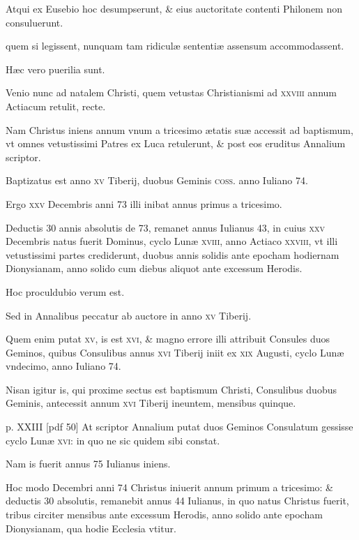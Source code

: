 \begin{parnumbers}
Atqui ex Eusebio
hoc desumpserunt, \& eius auctoritate contenti Philonem non consuluerunt.

quem si legissent, nunquam tam ridiculæ sententiæ assensum
accommodassent.

Hæc vero puerilia sunt.

Venio nunc ad natalem
Christi, quem vetustas Christianismi ad \textsc{xxviii} annum Actiacum
retulit, recte.

Nam Christus iniens annum vnum a tricesimo
ætatis suæ accessit ad baptismum, vt omnes vetustissimi Patres ex
Luca retulerunt, \& post eos eruditus Annalium scriptor.

Baptizatus est anno \textsc{xv} Tiberij, duobus Geminis \textsc{coss}. anno
Iuliano 74.

Ergo \textsc{xxv} Decembris anni 73 illi inibat annus primus a tricesimo.

Deductis 30 annis absolutis de 73, remanet annus Iulianus
43, in cuius \textsc{xxv} Decembris natus fuerit Dominus, cyclo Lunæ
\textsc{xviii}, anno Actiaco \textsc{xxviii},
 vt illi vetustissimi partes crediderunt,
duobus annis solidis ante epocham hodiernam Dionysianam,
anno solido cum diebus aliquot ante excessum Herodis.

Hoc proculdubio
verum est.

Sed in Annalibus peccatur ab auctore in anno
\textsc{xv} Tiberij.

Quem enim putat \textsc{xv}, is est \textsc{xvi}, \& magno errore illi
attribuit Consules duos Geminos, quibus Consulibus annus \textsc{xvi}
Tiberij iniit ex \textsc{xix} Augusti, cyclo Lunæ vndecimo, anno Iuliano
74.

Nisan igitur is, qui proxime sectus est baptismum Christi,
Consulibus duobus Geminis, antecessit annum \textsc{xvi} Tiberij ineuntem,
mensibus quinque.

\clearpage
p. XXIII [pdf 50]
At scriptor Annalium putat duos Geminos
Consulatum gessisse cyclo Lunæ \textsc{xvi}: in quo ne sic quidem
sibi constat.

Nam is fuerit annus 75 Iulianus iniens.

Hoc modo Decembri anni 74 Christus iniuerit annum primum a tricesimo: \&
deductis 30 absolutis, remanebit annus 44 Iulianus, in quo natus
Christus fuerit, tribus circiter mensibus ante excessum Herodis, anno
solido ante epocham Dionysianam, qua hodie Ecclesia vtitur.


\end{parnumbers}
